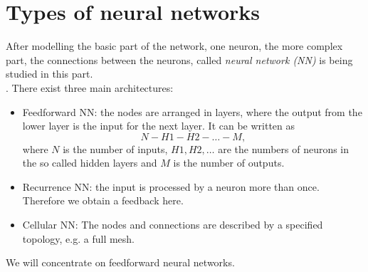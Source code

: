 \section{Types of neural networks}
After modelling the basic part of the network, one neuron, the more complex part, the connections between the neurons, called \emph{neural network (NN)} is being studied in this part.\\
\cite[~p.6]{EinfAstroPhys}. There exist three main architectures:
\begin{itemize}
\item Feedforward NN: the nodes are arranged in layers, where the output from the lower layer is the input for the next layer. It can be written as
\[ N - H1 - H2 - \ldots - M, \]
where $N$ is the number of inputs, $H1, H2, \ldots$ are the numbers of neurons in the so called hidden layers and $M$ is the number of outputs.
\item Recurrence NN: the input is processed by a neuron more than once. Therefore we obtain a feedback here. 
\item Cellular NN: The nodes and connections are described by a specified topology, e.g. a full mesh.
\end{itemize}
We will concentrate on feedforward neural networks.

